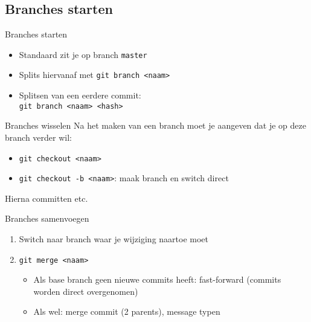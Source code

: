 \subsection{Branches starten}
\begin{frame}{Branches starten}
	\begin{itemize}
		\item Standaard zit je op branch \texttt{master}
		\item Splits hiervanaf met \texttt{git branch <naam>}
		\item Splitsen van een eerdere commit:\\
			\texttt{git branch <naam> <hash>}
	\end{itemize}
\end{frame}

\begin{frame}{Branches wisselen}
	Na het maken van een branch moet je aangeven dat je op deze branch verder wil:
	\begin{itemize}
		\item \texttt{git checkout <naam>}
		\item \texttt{git checkout -b <naam>}: maak branch en switch direct
	\end{itemize}
	Hierna committen etc.
\end{frame}

\begin{frame}{Branches samenvoegen}
	\begin{enumerate}
		\item Switch naar branch waar je wijziging naartoe moet
		\item \texttt{git merge <naam>}
			\begin{itemize}
				\item Als base branch geen nieuwe commits heeft: fast-forward (commits worden direct overgenomen)
				\item Als wel: merge commit (2 parents), message typen
			\end{itemize}
	\end{enumerate}
\end{frame}


